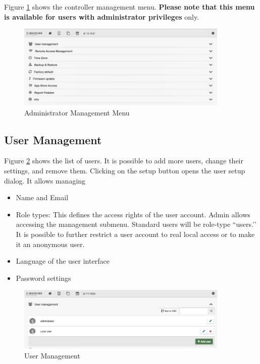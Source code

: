 Figure \ref{shui91} shows the controller management menu. \textbf{Please note that this 
menu is available for users with administrator privileges} only.

\begin{figure}
\begin{center}
\includegraphics[width=0.9\textwidth]{pngs/cap4/shui91.png}
\caption{Administrator Management Menu}
\label{shui91}
\end{center}
\end{figure}

\subsection{User Management}


Figure \ref{shui71} shows the list of users. It is possible to add more users, change 
their settings, and remove them. Clicking on the setup button opens the user setup dialog. 
It allows managing

\begin{itemize}
\item Name and Email
\item Role types: This defines the access rights of the user account. Admin allows 
accessing the management submenu. Standard users will be role-type ``users.’’ It is 
possible to further restrict a user account to real local access or to make it an 
anonymous user.
\item Language of the user interface
\item Password settings
\end{itemize}

\begin{figure}
\begin{center}
\includegraphics[width=0.9\textwidth]{pngs/cap4/shui71.png}
\caption{User Management}
\label{shui71}
\end{center}
\end{figure}

